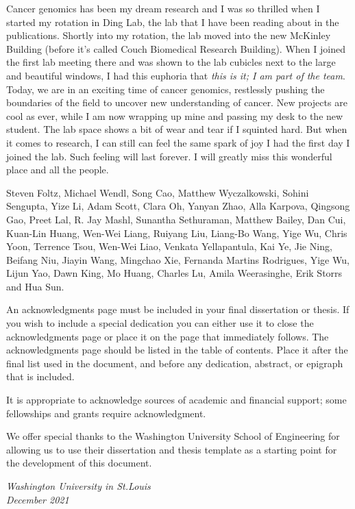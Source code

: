 \thesisacknowledgments

Cancer genomics has been my dream research and I was so thrilled when I started my rotation in Ding Lab, the lab that I have been reading about in the publications.
Shortly into my rotation, the lab moved into the new McKinley Building (before it's called Couch Biomedical Research Building). When I joined the first lab meeting there and was shown to the lab cubicles next to the large and beautiful windows, I had this euphoria that \textit{this is it; I am part of the team}.
Today, we are in an exciting time of cancer genomics, restlessly pushing the boundaries of the field to uncover new understanding of cancer.
New projects are cool as ever, while I am now wrapping up mine and passing my desk to the new student.
The lab space shows a bit of wear and tear if I squinted hard.
But when it comes to research, I can still can feel the same spark of joy I had the first day I joined the lab.
Such feeling will last forever.
I will greatly miss this wonderful place and all the people.


Steven Foltz, Michael Wendl, Song Cao, Matthew Wyczalkowski, Sohini Sengupta, Yize Li, Adam Scott, Clara Oh, Yanyan Zhao, Alla Karpova, Qingsong Gao, Preet Lal, R. Jay Mashl, Sunantha Sethuraman, Matthew Bailey, Dan Cui, Kuan-Lin Huang, Wen-Wei Liang, Ruiyang Liu, Liang-Bo Wang, Yige Wu, Chris Yoon, Terrence Tsou, Wen-Wei Liao, Venkata Yellapantula, Kai Ye, Jie Ning, Beifang Niu, Jiayin Wang, Mingchao Xie, Fernanda Martins Rodrigues, Yige Wu, Lijun Yao, Dawn King, Mo Huang, Charles Lu, Amila Weerasinghe, Erik Storrs and Hua Sun.

An acknowledgments page must be included in your final dissertation or thesis.  If you wish to
include a special dedication you can either use it to close the acknowledgments page or place it on
the page that immediately follows.  The acknowledgments page should be listed in the table of
contents.  Place it after the final list used in the document, and before any dedication, abstract,
or epigraph that is included.

It is appropriate to acknowledge sources of academic and financial support; some fellowships and
grants require acknowledgment.

We offer special thanks to the Washington University School of Engineering for allowing us to use
their dissertation and thesis template as a starting point for the development of this document.

\null\hfill \thesisauthor

\noindent
\textit{Washington University in St.\@ Louis}\\
\textit{December 2021}
